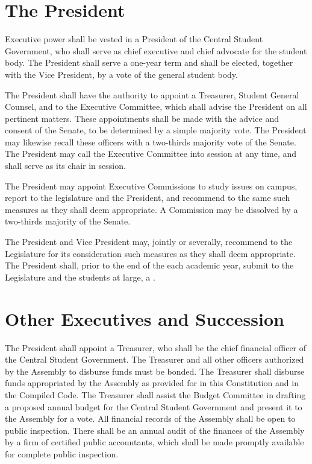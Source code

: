 
\section{The President}
    Executive power shall be vested in a President of the Central Student Government, who shall serve as chief executive and chief advocate for the student body. The President shall serve a one-year term and shall be elected, together with the Vice President, by a vote of the general student body.

    The President shall have the authority to appoint a Treasurer, Student General Counsel, and  to the Executive Committee, which shall advise the President on all pertinent matters. These appointments shall be made with the advice and consent of the Senate, to be determined by a simple majority vote. The President may likewise recall these officers with a two-thirds majority vote of the Senate. The President may call the Executive Committee into session at any time, and shall serve as its chair in session. 
    
    The President may appoint Executive Commissions to study issues on campus, report to the legislature and the President, and recommend to the same such measures as they shall deem appropriate. A Commission may be dissolved by a two-thirds majority of the Senate. 

    The President and Vice President may, jointly or severally, recommend to the Legislature for its consideration such measures as they shall deem appropriate. The President shall, prior to the end of the each academic year, submit to the Legislature and the students at large, a .

\section{Other Executives and Succession}
   The President shall appoint a Treasurer, who shall be the chief financial officer of the Central Student Government. The Treasurer and all other officers authorized by the Assembly to disburse funds must be bonded. The Treasurer shall disburse funds appropriated by the Assembly as provided for in this Constitution and in the Compiled Code. The Treasurer shall assist the Budget Committee in drafting a proposed annual budget for the Central Student Government and present it to the Assembly for a vote. All financial records of the Assembly shall be open to public inspection. There shall be an annual audit of the finances of the Assembly by a firm of certified public accountants, which shall be made promptly available for complete public inspection.

